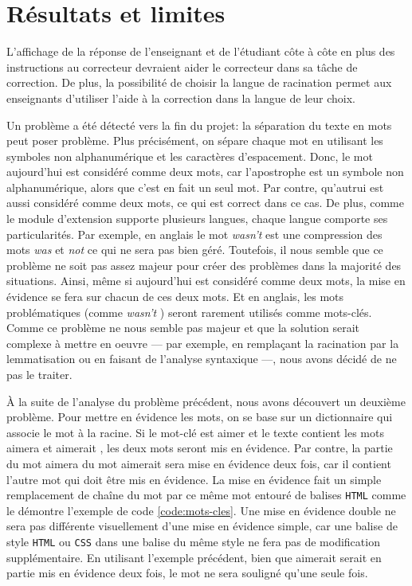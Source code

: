 \chapter{R\'esultats et limites}
L'affichage de la r\'eponse de l'enseignant et de l'\'etudiant c\^ote \`a c\^ote en plus des instructions au correcteur devraient aider le correcteur dans sa t\^ache de correction.
De plus, la possibilit\'e de choisir la langue de racination permet aux enseignants d'utiliser l'aide \`a la correction dans la langue de leur choix.

Un probl\`eme a \'et\'e d\'etect\'e vers la fin du projet: la s\'eparation du texte en mots peut poser probl\`eme.
Plus pr\'ecis\'ement, on s\'epare chaque mot en utilisant les symboles non alphanum\'erique et les caract\`eres d'espacement.
Donc, le mot \og aujourd'hui \fg{} est consid\'er\'e comme deux mots, car l'apostrophe est un symbole non alphanum\'erique, alors que c'est en fait un seul mot.
Par contre, \og qu'autrui \fg{} est aussi consid\'er\'e comme deux mots, ce qui est correct dans ce cas.
De plus, comme le module d'extension supporte plusieurs langues, chaque langue comporte ses particularit\'es.
Par exemple, en anglais le mot \og \textit{wasn't} \fg{} est une compression des mots \og \textit{was} \fg{} et \og \textit{not} \fg{} ce qui ne sera pas bien g\'er\'e.
Toutefois, il nous semble que ce probl\`eme ne soit pas assez majeur pour cr\'eer des probl\`emes dans la majorit\'e des situations.
Ainsi, m\^eme si \og aujourd'hui \fg{} est consid\'er\'e comme deux mots, la mise en \'evidence se fera sur chacun de ces deux mots.
Et en anglais, les mots probl\'ematiques (comme \og \textit{wasn't} \fg{}) seront rarement utilis\'es comme mots-cl\'es.
Comme ce probl\`eme ne nous semble pas majeur et que la solution serait complexe \`a mettre en oeuvre --- par exemple, en rempla\c{c}ant la racination par la lemmatisation ou en faisant de l'analyse syntaxique ---, nous avons d\'ecidé de ne pas le traiter.

\`A la suite de l'analyse du probl\`eme pr\'ec\'edent, nous avons d\'ecouvert un deuxi\`eme probl\`eme.
Pour mettre en \'evidence les mots, on se base sur un dictionnaire qui associe le mot \`a la racine.
Si le mot-cl\'e est \og aimer \fg{} et le texte contient les mots \og aimera \fg{} et \og aimerait \fg{}, les deux mots seront mis en \'evidence.
Par contre, la partie du mot \og aimera \fg{} du mot \og aimerait \fg{} sera mise en \'evidence deux fois, car il contient l'autre mot qui doit \^etre mis en \'evidence.
La mise en \'evidence fait un simple remplacement de cha\^ine du mot par ce m\^eme mot entour\'e de balises \texttt{HTML} comme le d\'emontre l'exemple de code \ref{code:mots-cles}.
Une mise en \'evidence double ne sera pas diff\'erente visuellement d'une mise en \'evidence simple, car une balise de style \texttt{HTML} ou \texttt{CSS} dans une balise du m\^eme style ne fera pas de modification suppl\'ementaire.
En utilisant l'exemple pr\'ec\'edent, bien que \og aimerait \fg{} serait en partie mis en \'evidence deux fois, le mot ne sera soulign\'e qu'une seule fois.

